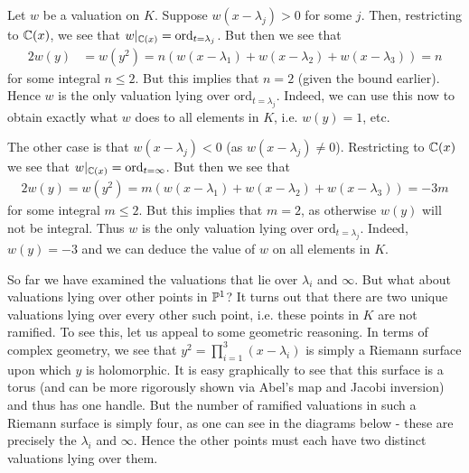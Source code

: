 \documentclass{../../mathnotes}
\begin{document}
Let $w$ be a valuation on $K$. Suppose $w(x-\lambda_j)>0$ for some $j$. Then, restricting to $\mathbb{C}(x)$, we see that $w|_{\mathbb{C}(x)}=\text{ord}_{t=\lambda_j}$.
But then we see that
\begin{align*}
    2w(y)&=w(y^2)=n\left(w(x-\lambda_1)+w(x-\lambda_2)+w(x-\lambda_3)\right)=n
\end{align*}
for some integral $n\leq 2$.
But this implies that $n=2$ (given the bound earlier). Hence $w$ is the only valuation lying over $\text{ord}_{t=\lambda_j}$. Indeed, we can
use this now to obtain exactly what $w$ does to all elements in $K$, i.e. $w(y)=1$, etc.

The other case is that $w(x-\lambda_j)<0$ (as $w(x-\lambda_j)\neq 0$). Restricting to $\mathbb{C}(x)$ we see that $w|_{\mathbb{C}(x)}=\text{ord}_{t=\infty}$.
But then we see that
\begin{align*}
    2w(y)=w(y^2)=m\left( w(x-\lambda_1)+w(x-\lambda_2)+w(x-\lambda_3) \right)=-3m
\end{align*}
for some integral $m\leq 2$. But this implies that $m=2$, as otherwise $w(y)$ will not be integral. Thus $w$ is the only valuation
lying over $\text{ord}_{t=\lambda_j}$. Indeed, $w(y)=-3$ and we can deduce the value of $w$ on all elements in $K$.

So far we have examined the valuations that lie over $\lambda_i$ and $\infty$. But what about valuations lying over other points in $\mathbb{P}^1$?
It turns out that there are two unique valuations lying over every other such point, i.e. these points in $K$ are not ramified. To see this, let
us appeal to some geometric reasoning. In terms of complex geometry, we see that $y^2=\prod_{i=1}^3(x-\lambda_i)$ is simply a Riemann surface
upon which $y$ is holomorphic. It is easy graphically to see that this surface is a torus (and can be more rigorously shown via Abel's map and
Jacobi inversion) and thus has one handle. But the number of ramified valuations in such a Riemann surface is simply four, as one can see in the
diagrams below - these are precisely the $\lambda_i$ and $\infty$. Hence the other points must each have two distinct valuations lying over them.
\end{document}
